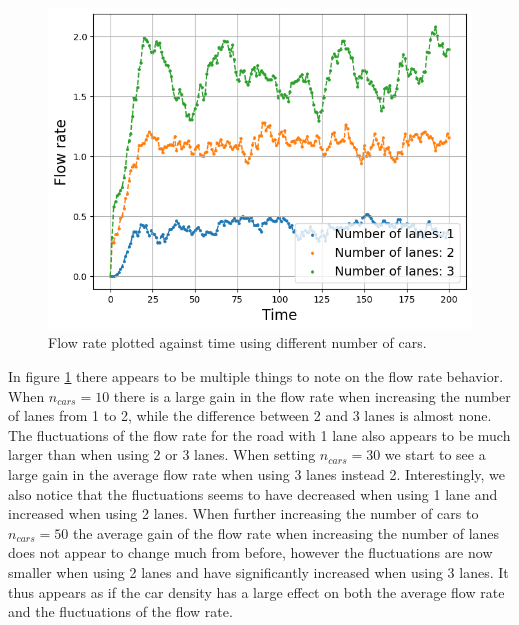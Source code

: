 \documentclass[a4paper,12pt]{article}
\begin{document}
\begin{figure}[H]
\begin{minipage}{.5\textwidth}
    \end{minipage}
    \centering
    \begin{minipage}{.5\textwidth}
        \centering
        \includegraphics[scale=0.47]{Images/flowrate time 50 cars.png}
    \end{minipage}%
    \caption{Flow rate plotted against time using different number of cars.}
    \label{flowrate}
\end{figure}
In figure \ref*{flowrate} there appears to be multiple things to note on the flow rate behavior. When $n_{cars}=10$ there is a large gain in the flow rate when increasing
the number of lanes from 1 to 2, while the difference between 2 and 3 lanes is almost none. The fluctuations of the flow rate for the road with 1 lane also
appears to be much larger than when using 2 or 3 lanes. When setting $n_{cars}=30$ we start to see a large gain in the average flow rate when using 3 lanes instead 2.
Interestingly, we also notice that the fluctuations seems to have decreased when using 1 lane and increased when using 2 lanes. 
When further increasing the number of cars to $n_{cars} = 50$ the average gain of the flow rate when increasing the number of lanes
does not appear to change much from before, however the fluctuations are now smaller when using 2 lanes and have significantly increased when using 3 lanes.
It thus appears as if the car density has a large effect on both the average flow rate and the fluctuations of the flow rate.
\end{document}
